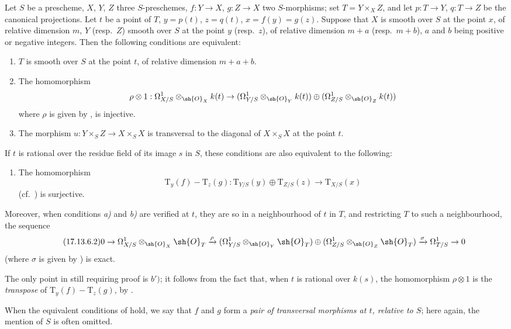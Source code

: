 \begin{corollary}[17.13.6]
\label{IV.17.13.6}
Let $S$ be a prescheme, $X$, $Y$, $Z$ three $S$-preschemes, $f:Y\to X$, $g:Z\to X$ two $S$-morphisms; set $T=Y\times_X Z$, and let $p:T\to Y$, $q:T\to Z$ be the canonical projections.
Let $t$ be a point of $T$, $y=p(t)$, $z=q(t)$, $x=f(y)=g(z)$.
Suppose that $X$ is smooth over $S$ at the point $x$, of relative dimension $m$, $Y$ (resp.\ $Z$) smooth over $S$ at the point $y$ (resp.\ $z$), of relative dimension $m+a$ (resp.\ $m+b$), $a$ and $b$ being positive or negative integers.
Then the following conditions are equivalent:
\begin{enumerate}[label=\alph*)]
  \item $T$ is smooth over $S$ at the point $t$, of relative dimension $m+a+b$.
  \item The homomorphism
  \[
    \rho\otimes 1: \Omega^1_{X/S}\otimes_{\sh{O}_X}k(t) \to (\Omega^1_{Y/S}\otimes_{\sh{O}_Y}k(t))\oplus(\Omega^1_{Z/S}\otimes_{\sh{O}_Z}k(t))
  \]
  where $\rho$ is given by , is injective.
  \item The morphism $u:Y\times_S Z\to X\times_S X$ is transversal to the diagonal of $X\times_S X$ at the point $t$.
\end{enumerate}
If $t$ is rational over the residue field of its image $s$ in $S$, these conditions are also equivalent to the following:
\begin{enumerate}
  \item[b${}'$)] The homomorphism
  \[
  \label{IV.17.13.6.1}
  \tag{17.13.6.1}
    \mathrm{T}_y(f)-\mathrm{T}_z(g): \mathrm{T}_{Y/S}(y)\oplus\mathrm{T}_{Z/S}(z) \to \mathrm{T}_{X/S}(x)
  \]
  (cf.\ ) is surjective.
\end{enumerate}
Moreover, when conditions \emph{a)} and \emph{b)} are verified at $t$, they are so in a neighbourhood of $t$ in $T$, and restricting $T$ to such a neighbourhood, the sequence
\[
\label{IV.17.13.6.2}
\tag{17.13.6.2}
  0 \to \Omega^1_{X/S}\otimes_{\sh{O}_X}\sh{O}_T \xrightarrow{\rho} (\Omega^1_{Y/S}\otimes_{\sh{O}_Y}\sh{O}_T)\oplus(\Omega^1_{Z/S}\otimes_{\sh{O}_Z}\sh{O}_T) \xrightarrow{\sigma} \Omega^1_{T/S} \to 0
\]
(where $\sigma$ is given by ) is exact.

The only point in  still requiring proof is $b')$; it follows from the fact that, when $t$ is rational over $k(s)$, the homomorphism $\rho\otimes1$ is the \emph{transpose} of $\mathrm{T}_y(f)-\mathrm{T}_z(g)$, by .

When the equivalent conditions of  hold, we say that $f$ and $g$ form a \emph{pair of transversal morphisms at $t$, relative to $S$}; here again, the mention of $S$ is often omitted.
\end{corollary}

